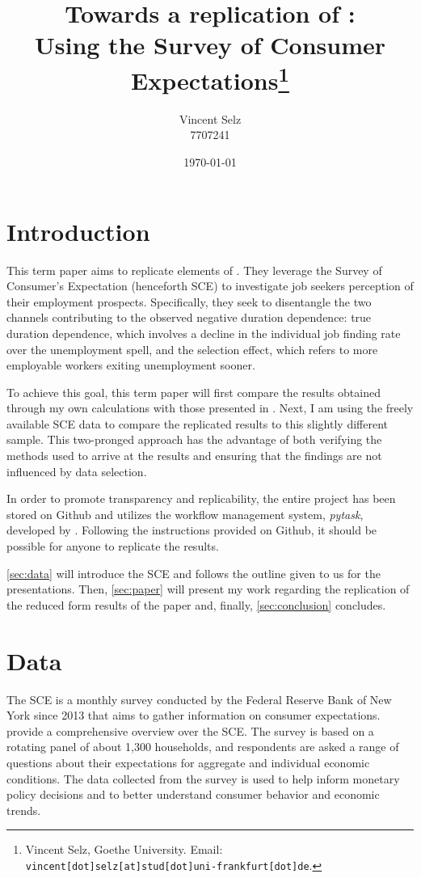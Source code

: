 \documentclass[11pt,a4paper,leqno]{article}
\title{Towards a replication of \textcite{MST2021}:  \\ Using the Survey of Consumer Expectations\thanks{Vincent Selz, Goethe University. Email: \texttt{vincent[dot]selz[at]stud[dot]uni-frankfurt[dot]de}. } }
\author{Vincent Selz \\ 7707241}
\date{
	\today
}
\begin{document}
\clearpage
\maketitle
\thispagestyle{empty}

\clearpage
\section{Introduction}
\setcounter{page}{1}
This term paper aims to replicate elements of \textcite{MST2021}. They leverage the Survey of Consumer's Expectation (henceforth SCE) to investigate job seekers perception of their employment prospects. Specifically, they seek to disentangle the two channels contributing to the observed negative duration dependence: true duration dependence, which involves a decline in the individual job finding rate over the unemployment spell, and the selection effect, which refers to more employable workers exiting unemployment sooner.

To achieve this goal, this term paper will first compare the results obtained through my own calculations with those presented in \textcite{MST2021}. Next, I am using the freely available SCE data to compare the replicated results to this slightly different sample. 
This two-pronged approach has the advantage of both verifying the methods used to arrive at the results and ensuring that the findings are not influenced by data selection.

In order to promote transparency and replicability, the entire project has been stored on Github and utilizes the workflow management system, \textit{pytask}, developed by \textcite{Raabe2020}.  Following the instructions provided on Github, it should be possible for anyone  to replicate the results.

\autoref{sec:data} will introduce the SCE and follows the outline given to us for the presentations. Then,
\autoref{sec:paper} will present my work regarding the replication of the reduced form results of the paper and, finally,  \autoref{sec:conclusion} concludes.

\section{Data} \label{sec:data}
The SCE is a monthly survey conducted by the Federal Reserve Bank of New York since 2013 that aims to gather information on consumer expectations. \textcite{SCEOverview} provide a comprehensive overview over the SCE. The survey is based on a rotating panel of about 1,300 households, and respondents are asked a range of questions about their expectations for aggregate and individual economic conditions. The data collected from the survey is used to help inform monetary policy decisions and to better understand consumer behavior and economic trends.
\end{document}
